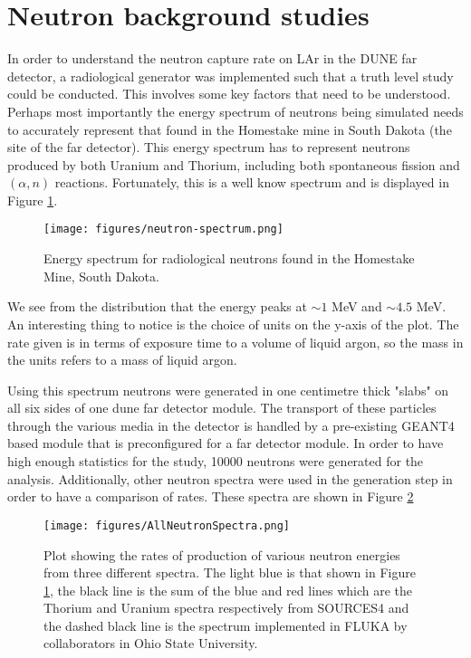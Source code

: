 \section{Neutron background studies}

In order to understand the neutron capture rate on LAr in the DUNE far detector, a radiological generator was implemented such that a truth level study could be conducted.
This involves some key factors that need to be understood.
Perhaps most importantly the energy spectrum of neutrons being simulated needs to accurately represent that found in the Homestake mine in South Dakota (the site of the far detector).
This energy spectrum has to represent neutrons produced by both Uranium and Thorium, including both spontaneous fission and $(\alpha, n)$ reactions.
Fortunately, this is a well know spectrum and is displayed in Figure \ref{fig:neutron-spectrum}.

\begin{figure}[h] %
   \centering
   \texttt{[image: figures/neutron-spectrum.png]} 
   \caption{Energy spectrum for radiological neutrons found in the Homestake Mine, South Dakota.}
   \label{fig:neutron-spectrum}
\end{figure}

We see from the distribution that the energy peaks at $\sim 1$ MeV and $\sim 4.5$ MeV.
An interesting thing to notice is the choice of units on the y-axis of the plot. 
The rate given is in terms of exposure time to a volume of liquid argon, so the mass in the units refers to a mass of liquid argon. 

Using this spectrum neutrons were generated in one centimetre thick "slabs" on all six sides of one dune far detector module.
The transport of these particles through the various media in the detector is handled by a pre-existing GEANT4 based module that is preconfigured for a far detector module.
In order to have high enough statistics for the study, 10000 neutrons were generated for the analysis.
Additionally, other neutron spectra were used in the generation step in order to have a comparison of rates.
These spectra are shown in Figure \ref{fig:allspectra}

\begin{figure}[h] %
   \centering
   \texttt{[image: figures/AllNeutronSpectra.png]} 
   \caption{Plot showing the rates of production of various neutron energies from three different spectra. The light blue is that shown in Figure \ref{fig:neutron-spectrum}, the black line is the sum of the blue and red lines which are the Thorium and Uranium spectra respectively from SOURCES4 and the dashed black line is the spectrum implemented in FLUKA by collaborators in Ohio State University.}
   \label{fig:allspectra}
\end{figure}

